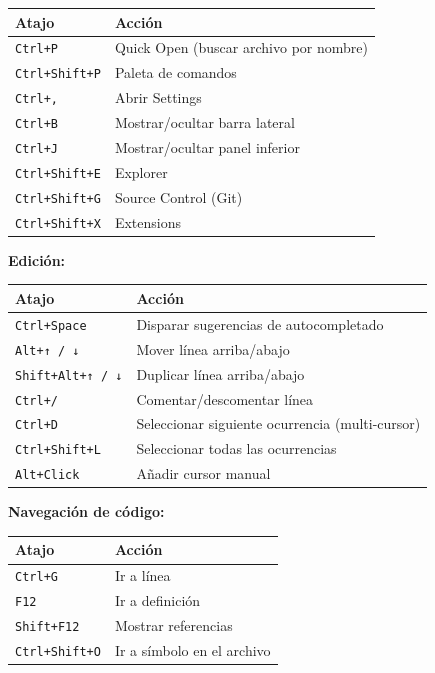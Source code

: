\documentclass[
  doc,
  floatsintext,
  longtable,
  a4paper,
  nolmodern,
  notxfonts,
  notimes,
  12pt,
  colorlinks=true,linkcolor=blue,citecolor=blue,urlcolor=blue]{apa7}
\newcounter{none} %
\begin{document}
{\def\LTcaptype{none} %
\begin{longtable}[]{@{}ll@{}}
\toprule\noalign{}
Atajo & Acción \\
\midrule\noalign{}
\endhead
\bottomrule\noalign{}
\endlastfoot
\texttt{Ctrl+P} & Quick Open (buscar archivo por nombre) \\
\texttt{Ctrl+Shift+P} & Paleta de comandos \\
\texttt{Ctrl+,} & Abrir Settings \\
\texttt{Ctrl+B} & Mostrar/ocultar barra lateral \\
\texttt{Ctrl+J} & Mostrar/ocultar panel inferior \\
\texttt{Ctrl+Shift+E} & Explorer \\
\texttt{Ctrl+Shift+G} & Source Control (Git) \\
\texttt{Ctrl+Shift+X} & Extensions \\
\end{longtable}
}

\textbf{Edición:}

{\def\LTcaptype{none} %
\begin{longtable}[]{@{}ll@{}}
\toprule\noalign{}
Atajo & Acción \\
\midrule\noalign{}
\endhead
\bottomrule\noalign{}
\endlastfoot
\texttt{Ctrl+Space} & Disparar sugerencias de autocompletado \\
\texttt{Alt+↑\ /\ ↓} & Mover línea arriba/abajo \\
\texttt{Shift+Alt+↑\ /\ ↓} & Duplicar línea arriba/abajo \\
\texttt{Ctrl+/} & Comentar/descomentar línea \\
\texttt{Ctrl+D} & Seleccionar siguiente ocurrencia (multi-cursor) \\
\texttt{Ctrl+Shift+L} & Seleccionar todas las ocurrencias \\
\texttt{Alt+Click} & Añadir cursor manual \\
\end{longtable}
}

\textbf{Navegación de código:}

{\def\LTcaptype{none} %
\begin{longtable}[]{@{}ll@{}}
\toprule\noalign{}
Atajo & Acción \\
\midrule\noalign{}
\endhead
\bottomrule\noalign{}
\endlastfoot
\texttt{Ctrl+G} & Ir a línea \\
\texttt{F12} & Ir a definición \\
\texttt{Shift+F12} & Mostrar referencias \\
\texttt{Ctrl+Shift+O} & Ir a símbolo en el archivo \\
\end{longtable}
}
\end{document}

